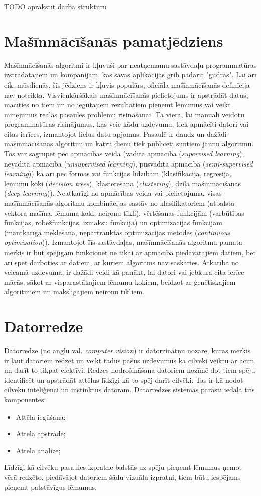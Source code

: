 TODO aprakstīt darba struktūru 

\section{Mašīnmācīšanās pamatjēdziens}
Mašīnmācīšanās algoritmi ir kļuvuši par neatņemamu sastāvdaļu programmatūras izstrādātājiem un kompānijām, kas savas aplikācijas grib padarīt "gudras". Lai arī cik, mūsdienās, šis jēdziens ir kļuvis populārs, oficiāla mašīnmācīšanās definīcija nav noteikta. Visvienkāršākais mašīnmācīšanās pielietojums ir apstrādāt datus, mācīties no tiem un no iegūtajiem rezultātiem pieņemt lēmumus vai veikt minējumus reālās pasaules problēmu risināšanai. Tā vietā, lai manuāli veidotu programmatūras risinājumus, kas veic kādu uzdevumu, tiek apmācīti datori vai citas ierīces, izmantojot lielus datu apjomus. 
Pasaulē ir daudz un dažādi mašīnmācīšanās algoritmi un katru dienu tiek publicēti simtiem jaunu algoritmu. Tos var sagrupēt pēc apmācības veida (vadītā apmācība (\textit{supervised learning}), nevadītā apmācība (\textit{unsupervised learning}), pusvadītā apmācība (\textit{semi-supervised learning})) kā arī pēc formas vai funkcijas līdzībām (klasifikācija, regresija, lēmumu koki (\textit{decision trees}), klasterēšana (\textit{clustering}), dziļā mašīnmācīšanās (\textit{deep learning})). Neatkarīgi no apmācības veida vai pielietojuma, visas mašīnmācīšanās algoritmu kombinācijas sastāv no klasifikatoriem (atbalsta vektora mašīna, lēmuma koki, neironu tīkli), vērtēšanas funkcijām (varbūtības funkcijas, robežfunkcijas, izmaksu funkcija) un optimizācijas funkcijām (mantkārīgā meklēšana, nepārtrauktās optimizācijas metodes (\textit{continuous optimization})). Izmantojot šīs sastāvdaļas, mašīnmācīšanās algoritmu pamata mērķis ir būt spējīgam funkcionēt ne tikai ar apmācībā piedāvātajiem datiem, bet arī spēt darboties ar datiem, ar kuriem algoritms nav saskāries. Atkarībā no veicamā uzdevuma, ir dažādi veidi kā panākt, lai datori vai jebkura cita ierīce mācās, sākot ar visparastākajiem lēmumu kokiem, beidzot ar ģenētiskajiem algoritmiem un mākslīgajiem neironu tīkliem. 


\newpage
\section{Datorredze}
Datorredze (no angļu val. \textit{computer vision}) ir datorzinātņu nozare, kuras mērķis ir ļaut datoriem redzēt un veikt tādus pašus uzdevumus kā cilvēki veiktu ar acīm un darīt to tikpat efektīvi. Redzes nodrošināšana datoriem nozīmē dot tiem spēju identificēt un apstrādāt attēlus līdzīgi kā to spēj darīt cilvēki. Tas ir kā nodot cilvēku inteliģenci un instinktus datoram. Datorredzes sistēmas parasti iedala trīs komponentēs:
\begin{itemize}
	\item Attēla iegūšana;
	\item Attēla apstrāde;
	\item Attēla analīze;
\end{itemize}
Līdzīgi kā cilvēku pasaules izpratne balstās uz spēju pieņemt lēmumus ņemot vērā redzēto, piedāvājot datoriem šādu vizuālu izpratni, tiem būtu iespējams pieņemt patstāvīgus lēmumus.


